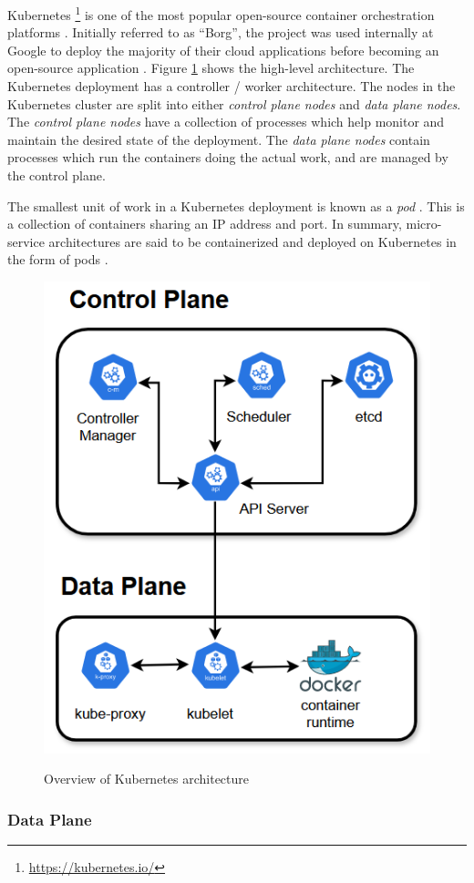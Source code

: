 Kubernetes \footnote{\url{https://kubernetes.io/}} is one of the most popular open-source container orchestration platforms \cite{vayghan2019kubernetes}. Initially referred to as ``Borg'', the project was used internally at Google to deploy the majority of their cloud applications before becoming an open-source application \cite{burns2016borg}. Figure \ref{fig:k8s-arch} shows the high-level architecture. The Kubernetes deployment has a controller / worker architecture. The nodes in the Kubernetes cluster are split into either \textit{control plane nodes} and \textit{data plane nodes}. The \textit{control plane nodes} have a collection of processes which help monitor and maintain the desired state of the deployment. The \textit{data plane nodes} contain processes which run the containers doing the actual work, and are managed by the control plane.\par
The smallest unit of work in a Kubernetes deployment is known as a \textit{pod} \cite{baier2017getting}. This is a collection of containers sharing an IP address and port. In summary, micro-service architectures are said to be containerized and deployed on Kubernetes in the form of pods \cite{vayghan2019kubernetes}.\par
\begin{figure}[htb]
    \centering
    \caption{Overview of Kubernetes architecture}
    \includegraphics[width=0.5\linewidth]{Figures/K8s-Architecture.png}
    \label{fig:k8s-arch}
\end{figure}

\subsubsection{Data Plane}
\label{subsubsec:k8s-data-plane}

